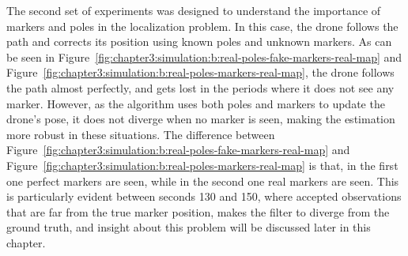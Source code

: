 The second set of experiments was designed to understand the importance of markers and poles in the localization problem. In this case, the drone follows the path and corrects its position using known poles and unknown markers. As can be seen in Figure~\ref{fig:chapter3:simulation:b:real-poles-fake-markers-real-map} and Figure~\ref{fig:chapter3:simulation:b:real-poles-markers-real-map}, the drone follows the path almost perfectly, and gets lost in the periods where it does not see any marker. However, as the algorithm uses both poles and markers to update the drone's pose, it does not diverge when no marker is seen, making the estimation more robust in these situations. The difference between Figure~\ref{fig:chapter3:simulation:b:real-poles-fake-markers-real-map} and Figure~\ref{fig:chapter3:simulation:b:real-poles-markers-real-map} is that, in the first one perfect markers are seen, while in the second one real markers are seen. This is particularly evident between seconds 130 and 150, where accepted observations that are far from the true marker position, makes the filter to diverge from the ground truth, and insight about this problem will be discussed later in this chapter.\\
